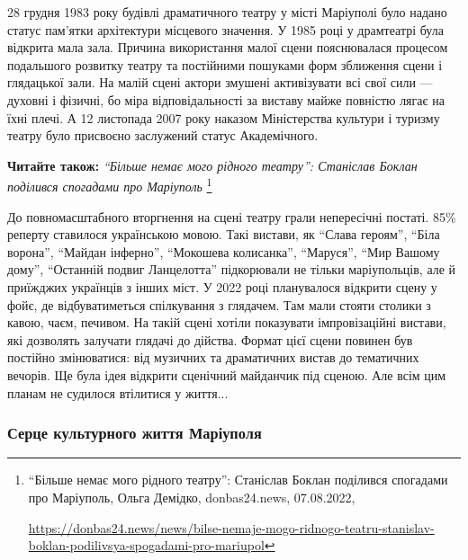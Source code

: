
28 грудня 1983 року будівлі драматичного театру у місті Маріуполі було надано
статус пам'ятки архітектури місцевого значення. У 1985 році у драмтеатрі була
відкрита мала зала. Причина використання малої сцени пояснювалася процесом
подальшого розвитку театру та постійними пошуками форм зближення сцени і
глядацької зали. На малій сцені актори змушені активізувати всі свої сили —
духовні і фізичні, бо міра відповідальності за виставу майже повністю лягає на
їхні плечі. А 12 листопада 2007 року наказом Міністерства культури і туризму
театру було присвоєно заслужений статус Академічного.

\textbf{Читайте також:} \emph{\enquote{Більше немає мого рідного театру}: Станіслав Боклан поділився спогадами про Маріуполь}%
\footnote{\enquote{Більше немає мого рідного театру}: Станіслав Боклан поділився спогадами про Маріуполь, Ольга Демідко, %
donbas24.news, 07.08.2022, \par%
\url{https://donbas24.news/news/bilse-nemaje-mogo-ridnogo-teatru-stanislav-boklan-podilivsya-spogadami-pro-mariupol}
}


До повномасштабного вторгнення на сцені театру грали непересічні постаті. 85\%
реперту ставилося українською мовою. Такі вистави, як \enquote{Слава героям}, \enquote{Біла
ворона}, \enquote{Майдан інферно}, \enquote{Мокошева колисанка}, \enquote{Маруся}, \enquote{Мир Вашому дому},
\enquote{Останній подвиг Ланцелотта} підкорювали не тільки маріупольців, але й
приїжджих українців з інших міст. У 2022 році планувалося відкрити сцену у
фойє, де відбуватиметься спілкування з глядачем. Там мали стояти столики з
кавою, чаєм, печивом. На такій сцені хотіли показувати імпровізаційні вистави,
які дозволять залучати глядачі до дійства. Формат цієї сцени повинен був
постійно змінюватися: від музичних та драматичних вистав до тематичних вечорів.
Ще була ідея відкрити сценічний майданчик під сценою. Але всім цим планам не
судилося втілитися у життя...


\subsubsection{Серце культурного життя Маріуполя}

